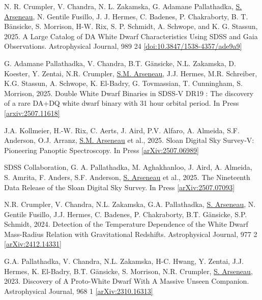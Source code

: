 \documentclass[letterpaper,11pt]{article}
\newenvironment{packed_enumerate}[1][]{
\begin{etaremune}[#1]
  \setlength{\itemsep}{3.7pt}
  \setlength{\parskip}{0pt}
  \setlength{\parsep}{0pt}}{\end{etaremune}
}
\begin{document}
\begin{packed_enumerate}

\item N. R. Crumpler, V. Chandra, N. L. Zakamska, G. Adamane Pallathadka, \underline{S. Arseneau}, N. Gentile Fusillo, J. J. Hermes, C. Badenes, P. Chakraborty, B. T. B\"ansicke, S. Morrison, H-W. Rix, S. P. Schmidt, A. Schwope, and K. G. Stassun, 2025. A Large Catalog of DA White Dwarf Characteristics Using SDSS and Gaia Observations. Astrophysical Journal, 989 24 \href{https://doi.org/10.3847/1538-4357/ade9a9}{[doi:10.3847/1538-4357/ade9a9]}

\item G. Adamane Pallathadka, V. Chandra, B.T. G\"ansicke, N.L. Zakamska, D. Koester, Y. Zentai, N.R. Crumpler, \underline{S.M. Arseneau}, J.J. Hermes, M.R. Schreiber, K.G. Stassun, A. Schwope, K. El-Badry, G. Tovmassian, T. Cunningham, S. Morrison, 2025. Double White Dwarf Binaries in SDSS-V DR19 : The discovery of a rare DA+DQ white dwarf binary with 31 hour orbital period. In Press \href{https://arxiv.org/abs/2507.11618}{[arxiv:2507.11618]}

\item  J.A. Kollmeier, H.-W. Rix, C. Aerts, J. Aird, P.V. Alfaro, A. Almeida, S.F. Anderson, O.J. Arranz, \underline{S.M. Arseneau} et al., 2025. Sloan Digital Sky Survey-V: Pioneering Panoptic Spectroscopy. In Press \href{https://https://arxiv.org/abs/2507.06989}{[arXiv:2507.06989]} 

\item  SDSS Collaboration, G. A. Pallathadka, M. Aghakhanloo, J. Aird, A. Almeida, S. Amrita, F. Anders, S.F. Anderson, \underline{S. Arseneau} et al., 2025. The Nineteenth Data Release of the Sloan Digital Sky Survey. In Press \href{https://https://arxiv.org/abs/2507.07093}{[arXiv:2507.07093]} 

\item  N.R. Crumpler, V. Chandra, N.L. Zakamska, G.A. Pallathadka, \underline{S. Arseneau}, N. Gentile Fusillo, J.J. Hermes, C. Badenes, P. Chakraborty, B.T. Gänsicke, S.P. Schmidt, 2024. Detection of the Temperature Dependence of the White Dwarf Mass-Radius Relation with Gravitational Redshifts. Astrophysical Journal, 977 2 \href{https://arxiv.org/abs/2412.14331}{[arXiv:2412.14331]} 

\item G.A. Pallathadka, V. Chandra, N.L. Zakamska, H-C. Hwang, Y. Zentai, J.J. Hermes, K. El-Badry, B.T. G\"ansicke, S. Morrison, N.R. Crumpler, \underline{S. Arseneau}, 2023. Discovery of A Proto-White Dwarf With A Massive Unseen Companion. Astrophysical Journal, 968 1 \href{https://doi.org/10.48550/arXiv.2310.16313}{[arXiv:2310.16313]}


\end{packed_enumerate}
\end{document}
